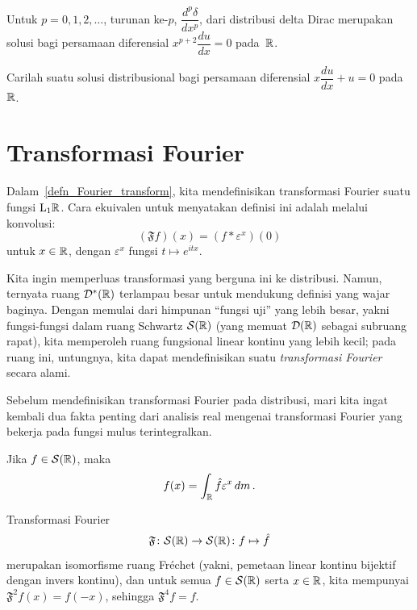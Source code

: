 \begin{exam} Untuk $p = 0,1,2,\dots$, turunan ke-$p$, $\dfrac{d^p\delta}{dx^p}$, dari distribusi delta Dirac merupakan solusi
bagi persamaan diferensial $x^{p+2}\dfrac{du}{dx} = 0$ pada~$\mathbb{R}$.
\end{exam}

\begin{exer} Carilah suatu solusi distribusional bagi persamaan diferensial $x \dfrac{du}{dx} + u = 0$ pada~$\mathbb{R}$.
\end{exer}










\section{Transformasi Fourier}\label{section_Fourier_transform}

Dalam~\ref{defn_Fourier_transform}, kita mendefinisikan transformasi Fourier suatu fungsi $\mathrm{L_{1}}\mathbb{R}$. Cara ekuivalen untuk menyatakan
definisi ini adalah melalui konvolusi:
  \[ (\mathfrak F f)(x) = (f \ast \varepsilon^x)(0) \]
untuk $x \in \mathbb{R}$, dengan $\varepsilon^x$ fungsi $t \mapsto e^{itx}$.

\begin{defn} Kita ingin memperluas transformasi yang berguna ini ke distribusi. Namun, ternyata ruang $\mathcal{D}^*(\mathbb{R})$ terlampau besar
untuk mendukung definisi yang wajar baginya. Dengan memulai dari himpunan ``fungsi uji'' yang lebih besar, yakni fungsi-fungsi dalam ruang Schwartz
$\mathcal{S}(\mathbb{R})$ (yang memuat $\mathcal{D}(\mathbb{R})$ sebagai subruang rapat), kita memperoleh ruang fungsional linear kontinu yang lebih kecil; pada ruang ini, untungnya, kita
dapat mendefinisikan suatu \emph{transformasi Fourier} secara alami.
\end{defn}

Sebelum mendefinisikan transformasi Fourier pada distribusi, mari kita ingat kembali dua fakta penting dari analisis real mengenai
transformasi Fourier yang bekerja pada fungsi mulus terintegralkan.

\begin{prop} Jika $f \in \mathcal{S}(\mathbb{R})$,
maka
   \[ f(x) = \int_{\mathbb{R}} \hat f \varepsilon^x\,dm\,. \]
\end{prop}

\begin{prop}\label{prop_FT_isomor1} Transformasi Fourier
   \[ \mathfrak F\colon \mathcal{S}(\mathbb{R}) \rightarrow \mathcal{S}(\mathbb{R})\colon f \mapsto \hat f \]
merupakan isomorfisme ruang Fr\'echet (yakni, pemetaan linear kontinu bijektif dengan invers kontinu), dan untuk semua
$f \in \mathcal{S}(\mathbb{R})$ serta $x \in \mathbb{R}$, kita mempunyai $\mathfrak F^2f(x) = f(-x)$, sehingga $\mathfrak F^4f = f$.
\end{prop}

